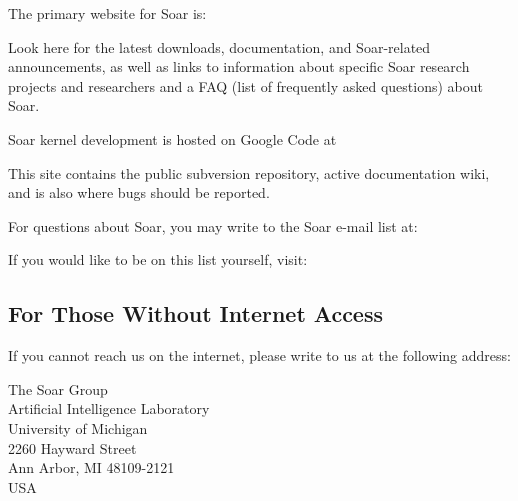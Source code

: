 The primary website for Soar is:

\hspace{2em}

Look here for the latest downloads, documentation, and Soar-related announcements, as well
as links to information about specific Soar research projects and researchers and a FAQ
(list of frequently asked questions) about Soar.

Soar kernel development is hosted on Google Code at

\hspace{2em}

This site contains the public subversion repository, active
documentation wiki, and is also where bugs should be reported.

For questions about Soar, you may write to the Soar e-mail list at:

\hspace{2em}

If you would like to be on this list yourself, visit:

\hspace{2em}




\newpage
\subsection*{For Those Without Internet Access}

If you cannot reach us on the internet, please write to us at the following 
address:

\begin{flushleft}
\hspace{2em}The Soar Group \\
\hspace{2em}Artificial Intelligence Laboratory \\
\hspace{2em}University of Michigan\\
\hspace{2em}2260 Hayward Street\\
\hspace{2em}Ann Arbor, MI 48109-2121 \\
\hspace{2em}USA \\
\end{flushleft}

